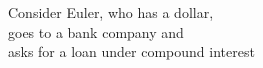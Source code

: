 \documentclass[preview]{standalone}
\begin{document}
\begin{center}
Consider Euler, who has a dollar, \\ goes to a bank company and \\ asks for a loan under compound interest
\end{center}
\end{document}
